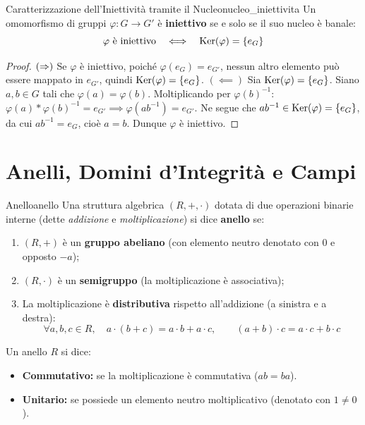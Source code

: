\begin{teorema}{Caratterizzazione dell'Iniettività tramite il Nucleo}{nucleo_iniettivita}
Un omomorfismo di gruppi $\varphi: G \to G'$ è \textbf{iniettivo} se e solo se il suo nucleo è banale:
\[
    \varphi \text{ è iniettivo} \quad \Longleftrightarrow \quad \operatorname{Ker}(\varphi) = \{e_G\}
\]
\end{teorema}
\begin{proof}
$(\Rightarrow)$ Se $\varphi$ è iniettivo, poiché $\varphi(e_G) = e_{G'}$, nessun altro elemento può essere mappato in $e_{G'}$, quindi $\operatorname{Ker}(\varphi) = \{e_G\}$.
$(\impliedby)$ Sia $\operatorname{Ker}(\varphi) = \{e_G\}$. Siano $a, b \in G$ tali che $\varphi(a) = \varphi(b)$.
Moltiplicando per $\varphi(b)^{-1}$: $\varphi(a) * \varphi(b)^{-1} = e_{G'} \implies \varphi(ab^{-1}) = e_{G'}$.
Ne segue che $ab^{-1} \in \operatorname{Ker}(\varphi) = \{e_G\}$, da cui $ab^{-1} = e_G$, cioè $a = b$. Dunque $\varphi$ è iniettivo.
\end{proof}

\section{Anelli, Domini d'Integrità e Campi}

\begin{definizione}{Anello}{anello}
Una struttura algebrica $(R, +, \cdot)$ dotata di due operazioni binarie interne (dette \emph{addizione} e \emph{moltiplicazione}) si dice \textbf{anello} se:
\begin{enumerate}
    \item $(R, +)$ è un \textbf{gruppo abeliano} (con elemento neutro denotato con $0$ e opposto $-a$);
    \item $(R, \cdot)$ è un \textbf{semigruppo} (la moltiplicazione è associativa);
    \item La moltiplicazione è \textbf{distributiva} rispetto all'addizione (a sinistra e a destra):
    \[
        \forall a, b, c \in R, \quad a \cdot (b + c) = a \cdot b + a \cdot c, \qquad (a + b) \cdot c = a \cdot c + b \cdot c
    \]
\end{enumerate}
Un anello $R$ si dice:
\begin{itemize}
    \item \textbf{Commutativo:} se la moltiplicazione è commutativa ($ab = ba$).
    \item \textbf{Unitario:} se possiede un elemento neutro moltiplicativo (denotato con $1 \neq 0$).
\end{itemize}
\end{definizione}

